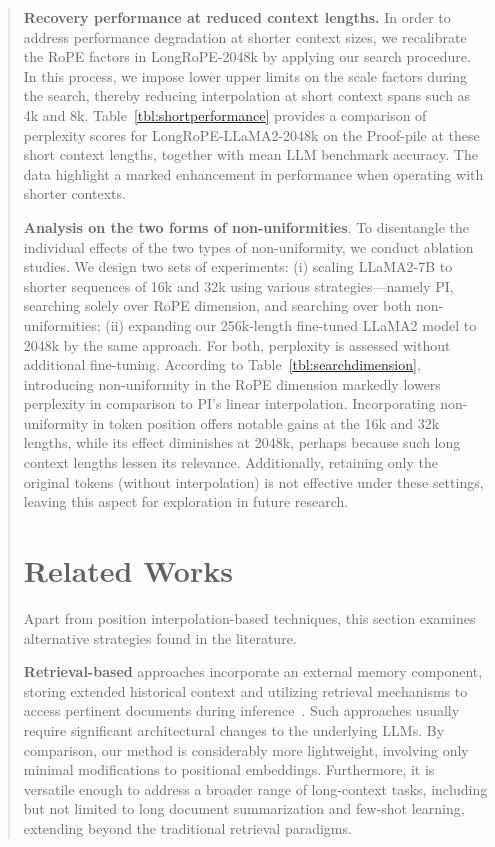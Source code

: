 \begin{abstract}
\textbf{Recovery performance at reduced context lengths.} In order to address performance degradation at shorter context sizes, we recalibrate the RoPE factors in LongRoPE-2048k by applying our search procedure. In this process, we impose lower upper limits on the scale factors during the search, thereby reducing interpolation at short context spans such as 4k and 8k. Table~\ref{tbl:shortperformance} provides a comparison of perplexity scores for LongRoPE-LLaMA2-2048k on the Proof-pile at these short context lengths, together with mean LLM benchmark accuracy. The data highlight a marked enhancement in performance when operating with shorter contexts.

\textbf{Analysis on the two forms of non-uniformities}. To disentangle the individual effects of the two types of non-uniformity, we conduct ablation studies. We design two sets of experiments: (i) scaling LLaMA2-7B to shorter sequences of 16k and 32k using various strategies—namely PI, searching solely over RoPE dimension, and searching over both non-uniformities; (ii) expanding our 256k-length fine-tuned LLaMA2 model to 2048k by the same approach. For both, perplexity is assessed without additional fine-tuning. According to Table~\ref{tbl:searchdimension}, introducing non-uniformity in the RoPE dimension markedly lowers perplexity in comparison to PI's linear interpolation. Incorporating non-uniformity in token position offers notable gains at the 16k and 32k lengths, while its effect diminishes at 2048k, perhaps because such long context lengths lessen its relevance. Additionally, retaining only the original tokens (without interpolation) is not effective under these settings, leaving this aspect for exploration in future research.

\section{Related Works}

Apart from position interpolation-based techniques, this section examines alternative strategies found in the literature.

\textbf{Retrieval-based} approaches incorporate an external memory component, storing extended historical context and utilizing retrieval mechanisms to access pertinent documents during inference~\cite{longllama,wang2023augmenting,borgeaud2022improving}. Such approaches usually require significant architectural changes to the underlying LLMs. By comparison, our method is considerably more lightweight, involving only minimal modifications to positional embeddings. Furthermore, it is versatile enough to address a broader range of long-context tasks, including but not limited to long document summarization and few-shot learning, extending beyond the traditional retrieval paradigms.


\end{abstract}
